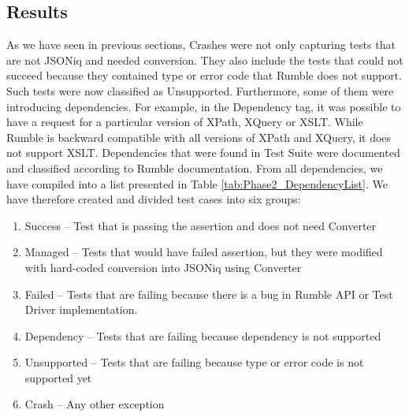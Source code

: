 \subsection{Results}
\label{Phase2_Results}
As we have seen in previous sections, Crashes were not only capturing tests that are not JSONiq and needed conversion. They also include the tests that could not succeed because they contained type or error code that Rumble does not support. Such tests were now classified as Unsupported. Furthermore, some of them were introducing dependencies. For example, in the Dependency tag, it was possible to have a request for a particular version of XPath, XQuery or XSLT. While Rumble is backward compatible with all versions of XPath and XQuery, it does not support XSLT. Dependencies that were found in Test Suite were documented and classified according to Rumble documentation. From all dependencies, we have compiled into a list presented in Table \ref{tab:Phase2_DependencyList}. We have therefore created and divided test cases into six groups:
\begin{enumerate}
	\item Success – Test that is passing the assertion and does not need Converter
	\item Managed – Tests that would have failed assertion, but they were modified with hard-coded conversion into JSONiq using Converter
	\item Failed – Tests that are failing because there is a bug in Rumble API or Test Driver implementation. 
	\item Dependency – Tests that are failing because dependency is not supported
	\item Unsupported – Tests that are failing because type or error code is not supported yet
	\item Crash – Any other exception
\end{enumerate}

